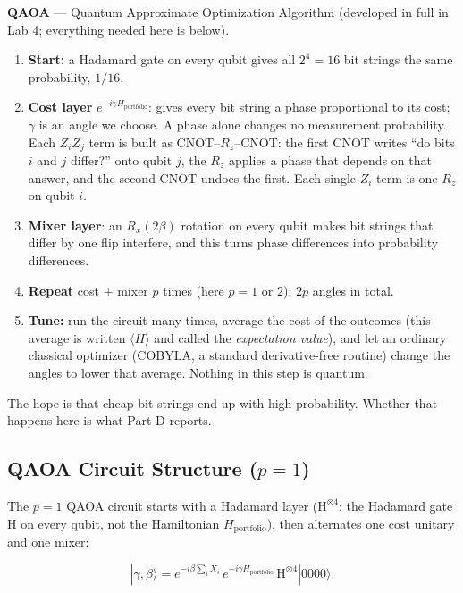 \documentclass[a4paper,11pt]{article}
\newcommand{\ket}[1]{|#1\rangle}
\newcommand{\expect}[1]{\langle #1 \rangle}
\begin{document}
\begin{defbox}
\textbf{QAOA} --- Quantum Approximate Optimization Algorithm (developed in
full in Lab 4; everything needed here is below).
\begin{enumerate}
    \item \textbf{Start:} a Hadamard gate on every qubit gives all $2^4 = 16$
          bit strings the same probability, $1/16$.
    \item \textbf{Cost layer} $e^{-i\gamma H_\text{portfolio}}$: gives every bit
          string a phase proportional to its cost; $\gamma$ is an angle we
          choose. A phase alone changes no measurement probability. Each
          $Z_iZ_j$ term is built as CNOT--$R_z$--CNOT: the first CNOT writes
          ``do bits $i$ and $j$ differ?'' onto qubit $j$, the $R_z$ applies a
          phase that depends on that answer, and the second CNOT undoes the
          first. Each single $Z_i$ term is one $R_z$ on qubit $i$.
    \item \textbf{Mixer layer}: an $R_x(2\beta)$ rotation on every qubit makes
          bit strings that differ by one flip interfere, and this turns phase
          differences into probability differences.
    \item \textbf{Repeat} cost + mixer $p$ times (here $p = 1$ or $2$):
          $2p$ angles in total.
    \item \textbf{Tune:} run the circuit many times, average the cost of the
          outcomes (this average is written $\expect{H}$ and called the
          \emph{expectation value}), and let an ordinary classical optimizer
          (COBYLA, a standard derivative-free routine) change the angles to
          lower that average. Nothing in this step is quantum.
\end{enumerate}
The hope is that cheap bit strings end up with high probability. Whether
that happens here is what Part D reports.
\end{defbox}

\subsection{QAOA Circuit Structure ($p=1$)}

The $p=1$ QAOA circuit starts with a Hadamard layer ($\mathrm{H}^{\otimes 4}$: the Hadamard gate
$\mathrm{H}$ on every qubit, not the Hamiltonian $H_\text{portfolio}$), then alternates one cost unitary
and one mixer:

\begin{equation}
    \ket{\gamma,\beta} =
    e^{-i\beta\sum_i X_i}\,
    e^{-i\gamma H_\text{portfolio}}\,
    \mathrm{H}^{\otimes 4}\ket{0000}.
\end{equation}
\end{document}
